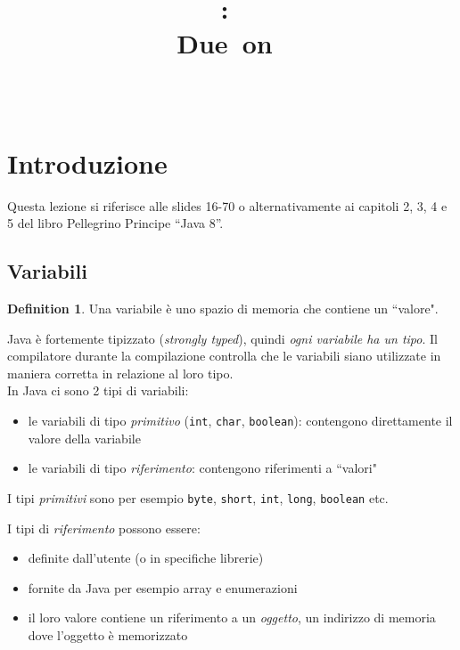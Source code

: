 \documentclass{article}
\title{
\vspace{2in}
\textmd{\textbf{\hmwkClass:\ \hmwkTitle}}\\
\normalsize\vspace{0.1in}\small{Due\ on\ \hmwkDueDate}\\
\vspace{0.1in}\large{\textit{\hmwkClassInstructor\ \hmwkClassTime}}
\vspace{3in}
}
\author{\textbf{\hmwkAuthorName}}
\date{} %
\begin{document}
\maketitle



\newpage
\tableofcontents
\newpage

\theoremstyle{definition} 

\newtheorem{mydef}{Definition}
\newtheorem{lemma}{Lemma}

\newtheorem{theorem}{Theorem}[section]


\section{Introduzione}
Questa lezione si riferisce alle slides 16-70  o alternativamente ai capitoli 2, 3, 4 e 5 del libro  Pellegrino Principe ``Java 8''.

\subsection{Variabili}
\begin{mydef} Una variabile è uno spazio di memoria che contiene un ``valore". 
\end{mydef}
Java è fortemente tipizzato (\emph{strongly typed}), quindi \emph{ogni variabile ha un tipo}. Il compilatore durante la compilazione controlla che le variabili siano utilizzate in maniera corretta in relazione al loro tipo.\\

In Java ci sono 2 tipi di variabili:
\begin{itemize}
\item le variabili di tipo \emph{primitivo} (\texttt{int}, \texttt{char}, \texttt{boolean}): contengono direttamente il valore della variabile
\item le variabili di tipo \emph{riferimento}: contengono riferimenti a ``valori"
\end{itemize}

I tipi \emph{primitivi} sono per esempio \texttt{byte}, \texttt{short}, \texttt{int}, \texttt{long}, \texttt{boolean} etc.


I tipi di \emph{riferimento} possono essere:
\begin{itemize}
\item definite dall'utente (o in specifiche librerie)
\item fornite da Java per esempio array e enumerazioni
\item il loro valore contiene un riferimento a un \emph{oggetto}, un indirizzo di memoria dove l'oggetto è memorizzato
\end{itemize}
\end{document}
